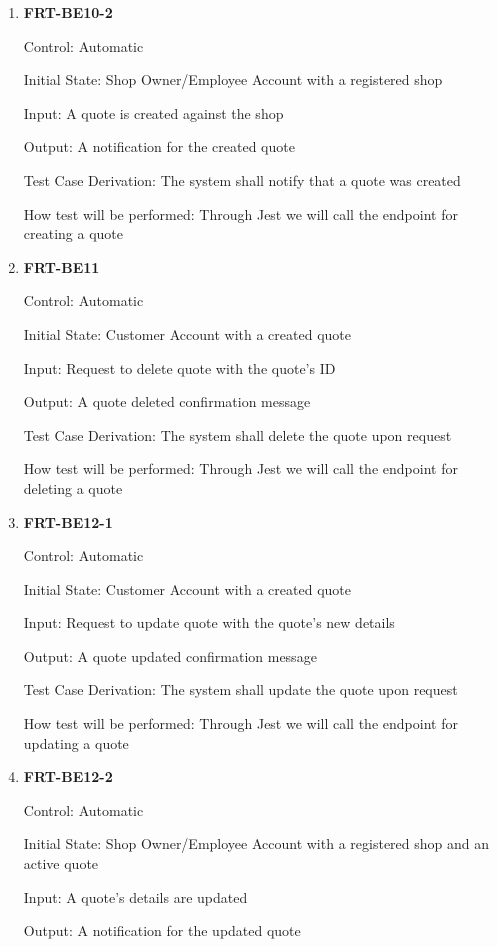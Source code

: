\documentclass[12pt, titlepage]{article}
\begin{document}
\begin{enumerate}
	\item \textbf{FRT-BE10-2}

	      Control: Automatic

	      Initial State: Shop Owner/Employee Account with a registered shop

	      Input: A quote is created against the shop

	      Output: A notification for the created quote

	      Test Case Derivation: The system shall notify that a quote was created

	      How test will be performed: Through Jest we will call the endpoint for creating a quote

	\item \textbf{FRT-BE11}

	      Control: Automatic

	      Initial State: Customer Account with a created quote

	      Input: Request to delete quote with the quote's ID

	      Output: A quote deleted confirmation message

	      Test Case Derivation: The system shall delete the quote upon request

	      How test will be performed: Through Jest we will call the endpoint for deleting a quote

	\item \textbf{FRT-BE12-1}

	      Control: Automatic

	      Initial State: Customer Account with a created quote

	      Input: Request to update quote with the quote's new details

	      Output: A quote updated confirmation message

	      Test Case Derivation: The system shall update the quote upon request

	      How test will be performed: Through Jest we will call the endpoint for updating a quote

	\item \textbf{FRT-BE12-2}

	      Control: Automatic

	      Initial State: Shop Owner/Employee Account with a registered shop and an active quote

	      Input: A quote's details are updated

	      Output: A notification for the updated quote


\end{enumerate}
\end{document}
